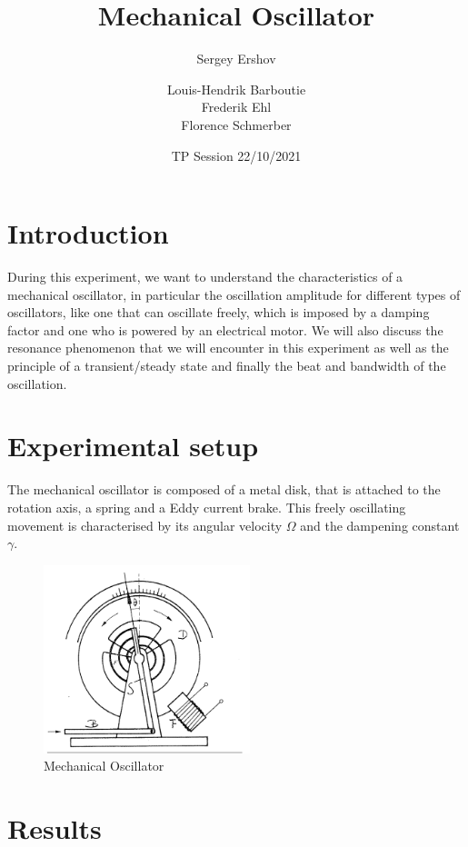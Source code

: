 \documentclass{scrartcl}
\title{Mechanical Oscillator}
\subtitle{Sergey Ershov}
\date{TP Session 22/10/2021}
\author{Louis-Hendrik Barboutie \\ Frederik Ehl \\ Florence Schmerber}
\begin{document}
\maketitle

\clearpage

\tableofcontents
\listoffigures
	
\clearpage


\section{Introduction}

During this experiment, we want to understand the characteristics of a mechanical oscillator, in particular the oscillation amplitude for different types of oscillators, like one that can oscillate freely, which is imposed by a damping factor and one who is powered by an electrical motor. We will also discuss the resonance phenomenon that we will encounter in this experiment as well as the principle of a transient/steady state and finally the beat and bandwidth of the oscillation.

\section{Experimental setup}

The mechanical oscillator is composed of a metal disk, that is attached to the rotation axis, a spring and a Eddy current brake. This freely oscillating movement is characterised by its angular velocity $\Omega$ and the dampening constant $\gamma$.

\medskip
\begin{figure} [h]
    \centering
    \includegraphics[width=6cm]{Mechanical_Oscillator.PNG}
    \caption{Mechanical Oscillator}
    \label{fig:}
\end{figure}

\section{Results}
\end{document}
